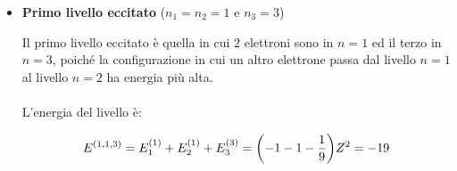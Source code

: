 \begin{itemize}
		la matrice si legge nel seguente modo: le \textit{righe} rappresentano le particelle (elettrone $1, 2, 3$) mentre le \textit{colonne} rappresentano gli stati disponibili. Se provassimo a scambiare due particelle (es. riga 1 con riga 2), per le proprietà dei determinanti, il risultato cambia segno. Questo soddisfa perfettamente il Principio di Pauli per tutti e tre gli elettroni contemporaneamente. Allora possiamo scrivere direttamente:
		
	\begin{align*}
		\Psi_0 = \frac{1}{\sqrt{3!}} \mqty| \ket{1, 0, 0, +}_1 & \ket{1, 0, 0, -}_1 & \ket{2, l, m, \pm}_1 \\ \ket{1, 0, 0, +}_2 & \ket{1, 0, 0, -}_2 & \ket{2, l, m, \pm}_2 \\  \ket{1, 0, 0, +}_3 & \ket{1, 0, 0, -}_3 & \ket{2, l, m, \pm}_3   |
	\end{align*}

		Il determinante di Slater può anche essere scritto come:
		
	\begin{align*}
		\Psi_0 = \frac{1}{\sqrt{3!}} \sum_{ijk} \varepsilon_{ijk} \qty(\ket{1, 0, 0, +}_i \ket{1, 0, 0, -}_j - \ket{1, 0, 0, -}_i \ket{1, 0, 0, +}_j) \otimes \ket{2, l, m, \pm}_k
	\end{align*}	
	
		dove si ricorda che $\varepsilon_{ijk}$ è un operatore che vale:
	
	\begin{itemize}
		\item $+1$, se la permutazione è pari ($1,2,3$ e cicliche),
		\item $0$, se due indici sono uguali,
		\item $-1$,  se la permutazione è dispari ($2, 1, 3$ e cicliche).
	\end{itemize}

	\item \textbf{Primo livello eccitato} ($n_1 = n_2 = 1$ e $n_3 = 3$)
		
		Il primo livello eccitato è quella in cui $2$ elettroni sono in $n = 1$ ed il terzo in $n = 3$, poiché la configurazione in cui un altro elettrone passa dal livello $n = 1$ al livello $ n = 2$ ha energia più alta.
		\\
		\\
		L'energia del livello è: 
		
	\begin{align*}
		E^{\qty(1, 1, 3)} = E_1^{\qty(1)} + E_2^{\qty(1)} + E_3^{\qty(3)} = \qty(-1-1-\frac{1}{9}) Z^2 = -19
	\end{align*}
	

\end{itemize}
